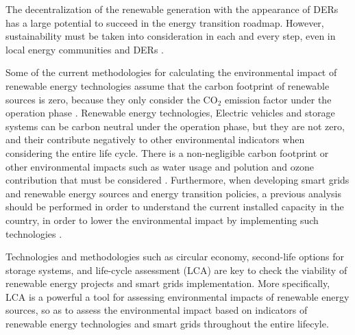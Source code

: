 The decentralization of the renewable generation with the appearance of DERs has a large potential to succeed in the energy transition roadmap. However, sustainability must be taken into consideration in each and every step, even in local energy communities and DERs \cite{AMPONSAH2014461}.

Some of the current methodologies for calculating the environmental impact of renewable energy technologies assume that the carbon footprint of renewable sources is zero, because they only consider the CO$_2$ emission factor under the operation phase \cite{IRENA2020}. Renewable energy technologies, Electric vehicles and storage systems can be carbon neutral under the operation phase, but they are not zero, and their contribute negatively to other environmental indicators when considering the entire life cycle. There is a non-negligible carbon footprint or other environmental impacts such as water usage and polution and ozone contribution that must be considered \cite{en12214214, Moro2017, Jiang2018}. Furthermore, when developing smart grids and renewable energy sources and energy transition policies, a previous analysis should be performed in order to understand the current installed capacity in the country, in order to lower the environmental impact by implementing such technologies \cite{Treyer2014}.
%

Technologies and methodologies such as circular economy, second-life options for storage systems, and life-cycle assessment (LCA) are key to check the viability of renewable energy projects and smart grids implementation. More specifically, LCA is a powerful a tool for assessing environmental impacts of renewable energy sources, so as to assess the environmental impact based on indicators of renewable energy technologies and smart grids throughout the entire lifecyle. 



\newpage 

